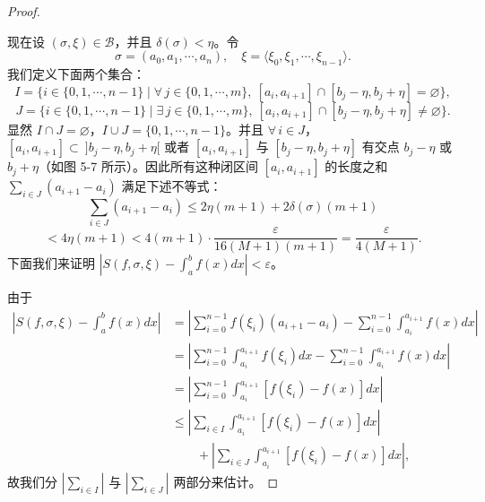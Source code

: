 \begin{proof}
\begin{figure}[htbp]
		\caption{}
		\label{fig:5-7}
	\end{figure}

	现在设 \((\sigma,\xi)\in\mathscr{B}\)，并且 \(\delta(\sigma)<\eta\)。令
	\[
	\sigma=(a_0,a_1,\cdots,a_n),\quad\xi=\langle\xi_0,\xi_1,\cdots,\xi_{n-1}\rangle.
	\]
	我们定义下面两个集合：
	\[
	I=\{i\in\{0,1,\cdots,n-1\}\mid\forall\,j\in\{0,1,\cdots,m\},\ [a_i,a_{i+1}]\cap[b_j-\eta,b_j+\eta]=\varnothing\},
	\]
	\[
	J=\{i\in\{0,1,\cdots,n-1\}\mid\exists\,j\in\{0,1,\cdots,m\},\ [a_i,a_{i+1}]\cap[b_j-\eta,b_j+\eta]\neq\varnothing\}.
	\]
	显然 \(I\cap J=\varnothing\)，\(I\cup J=\{0,1,\cdots,n-1\}\)。并且 \(\forall\,i\in J\)，\([a_i,a_{i+1}]\subset\ ]b_j-\eta,b_j+\eta[\) 或者 \([a_i,a_{i+1}]\) 与 \([b_j-\eta,b_j+\eta]\) 有交点 \(b_j-\eta\) 或 \(b_j+\eta\)（如图 5-7 所示）。因此所有这种闭区间 \([a_i,a_{i+1}]\) 的长度之和 \(\sum_{i\in J}(a_{i+1}-a_i)\) 满足下述不等式：
	\[
	\sum_{i\in J}(a_{i+1}-a_i)\le2\eta(m+1)+2\delta(\sigma)(m+1)
	\]
	\[
	<4\eta(m+1)<4(m+1)\cdot\frac{\varepsilon}{16(M+1)(m+1)}=\frac{\varepsilon}{4(M+1)}. \tag{*}
	\]
	下面我们来证明 \(\left|S(f,\sigma,\xi)-\int_a^b f(x)dx\right|<\varepsilon\)。

	由于
	\[
	\begin{aligned}
	\left|S(f,\sigma,\xi)-\int_a^b f(x)dx\right|
	&=\left|\sum_{i=0}^{n-1}f(\xi_i)(a_{i+1}-a_i)-\sum_{i=0}^{n-1}\int_{a_i}^{a_{i+1}}f(x)dx\right|\\
	&=\left|\sum_{i=0}^{n-1}\int_{a_i}^{a_{i+1}}f(\xi_i)dx-\sum_{i=0}^{n-1}\int_{a_i}^{a_{i+1}}f(x)dx\right|\\
	&=\left|\sum_{i=0}^{n-1}\int_{a_i}^{a_{i+1}}[f(\xi_i)-f(x)]dx\right|\\
	&\le\left|\sum_{i\in I}\int_{a_i}^{a_{i+1}}[f(\xi_i)-f(x)]dx\right|\\
	&\qquad+\left|\sum_{i\in J}\int_{a_i}^{a_{i+1}}[f(\xi_i)-f(x)]dx\right|,
	\end{aligned}
	\]
	故我们分 \(\left|\sum_{i\in I}\right|\) 与 \(\left|\sum_{i\in J}\right|\) 两部分来估计。


\end{proof}

